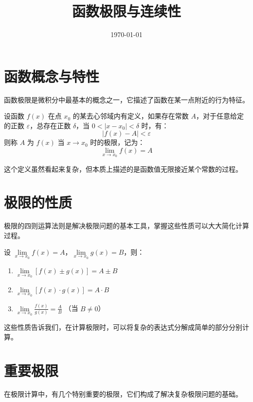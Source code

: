 \documentclass{ctexart}
\title{函数极限与连续性}
\date{\today}
\begin{document}
\maketitle

\section{函数概念与特性}
函数极限是微积分中最基本的概念之一，它描述了函数在某一点附近的行为特征。

\begin{definition}[函数极限]
设函数 $f(x)$ 在点 $x_0$ 的某去心邻域内有定义，如果存在常数 $A$，对于任意给定的正数 $\varepsilon$，总存在正数 $\delta$，当 $0<|x-x_0|<\delta$ 时，有：
\[ |f(x)-A|<\varepsilon \]
则称 $A$ 为 $f(x)$ 当 $x \to x_0$ 时的极限，记为：
\[ \lim_{x \to x_0} f(x) = A \]
\end{definition}

这个定义虽然看起来复杂，但本质上描述的是函数值无限接近某个常数的过程。

\section{极限的性质}
极限的四则运算法则是解决极限问题的基本工具，掌握这些性质可以大大简化计算过程。

\begin{theorem}[极限四则运算]
设 $\lim\limits_{x \to x_0} f(x) = A$，$\lim\limits_{x \to x_0} g(x) = B$，则：
\begin{enumerate}
    \item $\lim\limits_{x \to x_0} [f(x) \pm g(x)] = A \pm B$
    \item $\lim\limits_{x \to x_0} [f(x) \cdot g(x)] = A \cdot B$
    \item $\lim\limits_{x \to x_0} \frac{f(x)}{g(x)} = \frac{A}{B}$ （当 $B \neq 0$）
\end{enumerate}
\end{theorem}

这些性质告诉我们，在计算极限时，可以将复杂的表达式分解成简单的部分分别计算。

\section{重要极限}
在极限计算中，有几个特别重要的极限，它们构成了解决复杂极限问题的基础。
\end{document}
